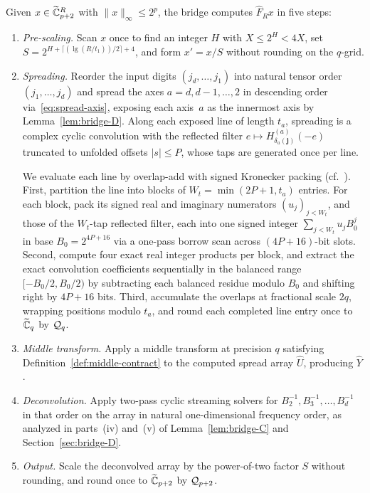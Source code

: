 Given $x\in\widetilde{\mathbb{C}}_{p+2}^R$ with $\|x\|_\infty\le 2^p$, the bridge computes $\widehat F_R x$ in five steps:
\begin{enumerate}[label=(\arabic*),leftmargin=*]
  \item \emph{Pre-scaling.} Scan $x$ once to find an integer $H$ with $X\le 2^H<4X$, set
    $S=2^{H+\lceil(\lg(R/t_1))/2\rceil+4}$, and form $x'=x/S$ without rounding on the $q$-grid.

  \item \emph{Spreading.} Reorder the input digits $(j_d,\dots,j_1)$ into natural tensor order $(j_1,\dots,j_d)$ and
    spread the axes $a=d,d-1,\dots,2$ in descending order via~\eqref{eq:spread-axis}, exposing each axis~$a$ as the
    innermost axis by Lemma~\ref{lem:bridge-D}. Along each exposed line of length $t_a$, spreading is a complex cyclic
    convolution with the reflected filter $e\mapsto H^{(a)}_{\delta_a(\mathbf j)}(-e)$ truncated to unfolded offsets
    $|s|\le P$, whose taps are generated once per line.

    We evaluate each line by overlap-add with signed Kronecker packing (cf.~\cite{MS}). First, partition the line into
    blocks of $W_t=\min(2P+1,t_a)$ entries. For each block, pack its signed real and imaginary numerators
    $(u_j)_{j<W_t}$, and those of the $W_t$-tap reflected filter, each into one signed integer $\sum_{j<W_t}u_j B_0^j$
    in base $B_0=2^{4P+16}$ via a one-pass borrow scan across $(4P+16)$-bit slots. Second, compute four exact real integer
    products per block, and extract the exact convolution coefficients sequentially in the balanced range
    $[-B_0/2,B_0/2)$ by subtracting each balanced residue modulo $B_0$ and shifting right by $4P+16$ bits. Third,
    accumulate the overlaps at fractional scale $2q$, wrapping positions modulo $t_a$, and round each completed line
    entry once to $\widetilde{\mathbb{C}}_q$ by $\mathcal{Q}_q$.

  \item \emph{Middle transform.} Apply a middle transform at precision $q$ satisfying
    Definition~\ref{def:middle-contract} to the computed spread array $\widehat U$, producing $\widehat Y$.

  \item \emph{Deconvolution.} Apply two-pass cyclic streaming solvers for $B_2^{-1},B_3^{-1},\dots,B_d^{-1}$ in that
    order on the array in natural one-dimensional frequency order, as analyzed in parts~(iv) and~(v) of
    Lemma~\ref{lem:bridge-C} and Section~\ref{sec:bridge-D}.

  \item \emph{Output.} Scale the deconvolved array by the power-of-two factor $S$ without rounding, and round once to
    $\widetilde{\mathbb{C}}_{p+2}$ by $\mathcal{Q}_{p+2}$.
\end{enumerate}

